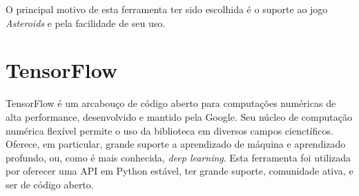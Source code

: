 O principal motivo de esta ferramenta ter sido escolhida é o suporte ao jogo \textit{Asteroids} e pela facilidade de seu uso.

\section{TensorFlow}
\label{sec:tensorflow}

TensorFlow é um arcabouço de código aberto para computações numéricas de alta performance, desenvolvido e mantido pela Google. Seu núcleo de computação numérica flexível permite o uso da biblioteca em diversos campos cienctíficos. Oferece, em particular, grande suporte a aprendizado de máquina e aprendizado profundo, ou, como é mais conhecida, \textit{deep learning}.
Esta ferramenta foi utilizada por oferecer uma API em Python estável, ter grande suporte, comunidade ativa, e ser de código aberto.

